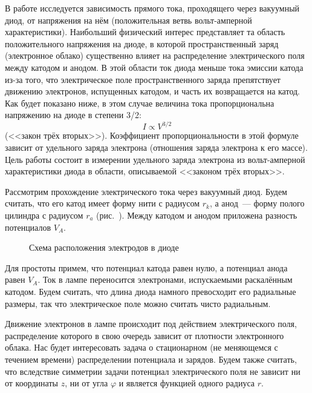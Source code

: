 
В работе исследуется зависимость прямого тока, проходящего через вакуумный диод, от напряжения на нём (положительная ветвь вольт-амперной характеристики). Наибольший физический интерес представляет та область положительного напряжения на диоде, в которой пространственный заряд (электронное облако) существенно влияет на распределение электрического поля между катодом и анодом. В этой области ток диода меньше тока эмиссии катода из-за того, что электрическое поле пространственного заряда препятствует движению электронов, испущенных катодом, и часть их возвращается на катод. Как будет показано ниже, в этом случае величина тока пропорциональна напряжению на диоде в степени 3/2:
\begin{equation}
	I\propto V^{3/2}
\end{equation}
(<<закон трёх вторых>>). Коэффициент пропорциональности в этой формуле зависит от удельного заряда электрона (отношения заряда электрона к его массе). Цель работы состоит в измерении удельного заряда электрона из вольт-амперной характеристики диода в области, описываемой <<законом трёх вторых>>.

Рассмотрим прохождение электрического тока через вакуумный диод. Будем считать, что его катод имеет форму нити с
радиусом $r_k$, а анод~--- форму полого цилиндра с радиусом $r_a$ (рис.~). Между катодом и анодом приложена разность потенциалов $V_A$.
\begin{figure}[h!]
	\caption{Схема расположения электродов в диоде}
\end{figure}

Для простоты примем, что потенциал катода равен нулю, а потенциал анода равен $V_A$. Ток в лампе переносится
электронами, испускаемыми раскалённым катодом. Будем считать, что длина диода намного превосходит его радиальные
размеры, так что электрическое поле можно считать чисто радиальным.

Движение электронов в лампе происходит под действием электрического поля, распределение которого в свою очередь зависит от плотности электронного облака. Нас будет интересовать задача о стационарном (не меняющемся с течением времени) распределении потенциала и зарядов. Будем также считать, что вследствие симметрии задачи потенциал электрического поля не зависит ни от координаты $z$, ни от угла $\varphi$ и является функцией одного радиуса $r$.

